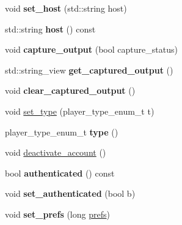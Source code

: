 \begin{DoxyCompactItemize}
\mbox{\label{classmods_1_1player_aa44c9145134cfbed36edcf10f3c0f2dc}} 
void {\bfseries set\+\_\+host} (std\+::string host)
\item 
\mbox{\label{classmods_1_1player_a62987a5ccddb984f048d2d6921d55817}} 
std\+::string {\bfseries host} () const
\item 
\mbox{\label{classmods_1_1player_a9b9ce853251b47cecf9a355010af8191}} 
void {\bfseries capture\+\_\+output} (bool capture\+\_\+status)
\item 
\mbox{\label{classmods_1_1player_a71cf4e3a0c9a61cd769b42e889648901}} 
std\+::string\+\_\+view {\bfseries get\+\_\+captured\+\_\+output} ()
\item 
\mbox{\label{classmods_1_1player_a4105554f0492c385628f95873db9f43d}} 
void {\bfseries clear\+\_\+captured\+\_\+output} ()
\item 
void \hyperlink{classmods_1_1player_a75e7ab6e28ec637e3d1a8f905162bf3e}{set\+\_\+type} (player\+\_\+type\+\_\+enum\+\_\+t t)
\item 
\mbox{\label{classmods_1_1player_ac3e0e49947a0467423dfa6dcd49ee221}} 
player\+\_\+type\+\_\+enum\+\_\+t {\bfseries type} ()
\item 
void \hyperlink{classmods_1_1player_abbbcc9a9d532b3fbfcd16faeb72e8a35}{deactivate\+\_\+account} ()
\item 
\mbox{\label{classmods_1_1player_a64c35848966d08ed05f855d1c62379db}} 
bool {\bfseries authenticated} () const
\item 
\mbox{\label{classmods_1_1player_adb9b217ecc48632204193e36f576a7d2}} 
void {\bfseries set\+\_\+authenticated} (bool b)
\item 
\mbox{\label{classmods_1_1player_ad0354db5732137a41995c4356b533102}} 
void {\bfseries set\+\_\+prefs} (long \hyperlink{classmods_1_1prefs}{prefs})
\item 
\mbox{\label{classmods_1_1player_a0ee2902819f112c4723abe3df1cd58ae}} 

\end{DoxyCompactItemize}
